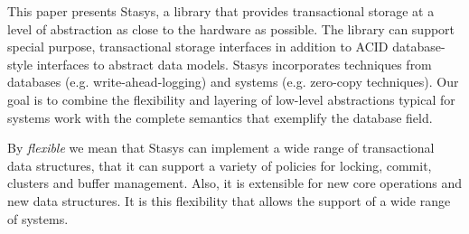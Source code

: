 \documentclass[letterpaper,twocolumn,10pt]{article}
\newcommand{\yad}{Stasys\xspace}
\newcommand{\eat}[1]{}
\begin{document}
\eat{
Examples of real world systems that currently fall into this category
are web search engines, document repositories, large-scale web-email
services, map and trip planning services, ticket reservation systems,
photo and video repositories, bioinformatics, version control systems,
work-flow applications, CAD/VLSI applications and directory services.

In short, we believe that a fundamental architectural shift in
transactional storage is necessary before general purpose storage
systems are of practical use to modern applications.
Until this change occurs, databases' imposition of unwanted
abstraction upon their users will restrict system designs and
implementations.
}

%


This paper presents \yad, a library that provides transactional
storage at a level of abstraction as close to the hardware as
possible.  The library can support special purpose, transactional
storage interfaces in addition to ACID database-style interfaces to
abstract data models.  \yad incorporates techniques from databases
(e.g. write-ahead-logging) and systems (e.g. zero-copy techniques).
Our goal is to combine the flexibility and layering of low-level
abstractions typical for systems work with the complete semantics
that exemplify the database field.

By {\em flexible} we mean that \yad{}  can implement a wide
range of transactional data structures, that it can support a variety
of policies for locking, commit, clusters and buffer management.
Also, it is extensible for new core operations
and new data structures. It is this flexibility that allows the
support of a wide range of systems.
\end{document}
